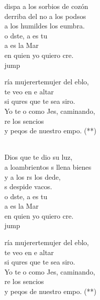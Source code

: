 \begin{cancion}
	dispa a los sorbios de cozón\\
	derriba del no a los podsos\\
	a los humildes los eumbra.\\
	o dste, a es tu \\
	a es la Mar \\
	en quien yo quiero cre.\\jump\\
	\begin{chorus}%
	ría mujerertemujer del eblo,\\
	 te veo en e altar\\
	si qures que te sea siro.\\
	Yo te o como Jes, caminando, \\
	re los sencios \\
	y peqos de nuestro empo. (**) \\
	\end{chorus}%
	\jump\\
	 Dios que te dio su luz,\\
	a loambrientos s llena  bienes\\
	y a los rs los dede,\\
	s despide vacos.\\
	o dste, a es tu \\
	a es la Mar \\
	en quien yo quiero cre.\\jump\\
	\begin{chorus}%
	ría mujerertemujer del eblo,\\
	 te veo en e altar\\
	si qures que te sea siro.\\
	Yo te o como Jes, caminando, \\
	re los sencios \\
	y peqos de nuestro empo. (**) \\
	\end{chorus}%
	\jump\\
\end{cancion}%

